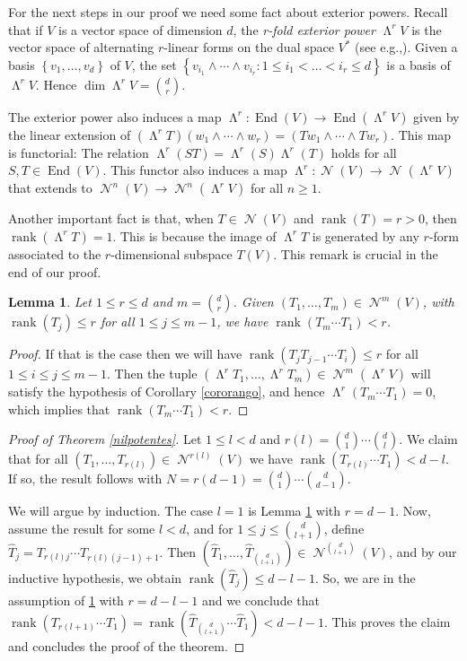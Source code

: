 \documentclass[11pt]{article}
\newcommand{\eg}{e.g.,\xspace}
\let\mathcal\mathscr
\theoremstyle{plain}
\newtheorem{lema}[teo]{Lemma}
\theoremstyle{definition}
\newcommand{\corchete}[1]{\left\{{#1}\right\}}
\DeclareMathOperator{\End}{End}
\DeclareMathOperator{\Nil}{\mathcal{N}}
\DeclareMathOperator{\rank}{rank}
\DeclareMathOperator{\Wedge}{\mathsf{\Lambda}}
\begin{document}
For the next steps in our proof we need some fact about exterior powers. Recall that if $V$ is a vector space of dimension $d$, the \textit{r-fold exterior power} $\Wedge^{r}{V}$ is the vector space of alternating $r$-linear forms on the dual space $V^*$ (see \eg \cite[XIX.1]{langalg}). Given a basis $\corchete{v_1,\dots, v_d}$ of $V$, the set
$\corchete{v_{i_1}\wedge \cdots \wedge v_{i_r} : 1\leq i_1<\dots <i_r\leq d}$ is a basis of $\Wedge^{r}{V}$. Hence $\dim {\Wedge^{r}V}=\binom{d}{r}$.

The exterior power also induces a map $\Wedge^{r}: \End(V) \rightarrow \End(\Wedge^{r}{V})$ given by the linear extension of $(\Wedge^{r}T)(w_1\wedge \cdots \wedge w_r)=(Tw_1\wedge \cdots \wedge Tw_r)$. This map is functorial: The relation $\Wedge^{r}(ST)=\Wedge^{r}(S)\Wedge^{r}(T)$ holds for all $S,T \in \End(V)$. This functor also induces a map $\Wedge^{r}: \Nil(V)\rightarrow \Nil(\Wedge^{r}{V})$ that extends to $\Nil^{n}(V)\rightarrow \Nil^{n}(\Wedge^{r}{V})$ for all $n\geq 1$.

Another important fact is that, when $T\in \Nil(V)$ and $\rank(T)=r>0$, then $\rank(\Wedge^{r}{T})=1$. This is because the image of $\Wedge^{r}{T}$ is generated by any $r$-form associated to the $r$-dimensional subspace $T(V)$. This remark is crucial in the end of our proof.

\begin{lema}\label{lemaa}
Let $1\leq r\leq d$ and $m=\binom{d}{r}$. Given $(T_1,\dots,T_m)\in \Nil^{m}(V)$, with $\rank(T_j) \leq r$ for all $1\leq j\leq m-1$, we have $\rank(T_{m}\cdots T_{1})<r$.
\end{lema}
\begin{proof}
If that is the case then we will have $\rank(T_{j}T_{j-1}\cdots T_{i})\leq r$ for all $1\leq i\leq j\leq m-1$. Then the tuple $(\Wedge^{r}{T_1},\dots,\Wedge^{r}{T_m})\in \Nil^{m}(\Wedge^{r}{V})$ will satisfy the hypothesis of Corollary \ref{cororango}, and hence $\Wedge^{r}(T_m\cdots T_1)=0$, which implies that \hbox{$\rank(T_m\cdots T_1 )<r$}.
\end{proof}

\begin{proof}[Proof of Theorem \ref{nilpotentes}]
Let $1\leq l< d$ and $r(l)= \binom{d}{1}\cdots \binom{d}{l}$. We claim that for all $(T_1,\dots,T_{r(l)})\in \Nil^{r(l)}(V)$ we have $\rank(T_{r(l)} \cdots T_{1})<d-l$. If so, the result follows with $N=r(d-1)=\binom{d}{1}\cdots \binom{d}{d-1}$.

We will argue by induction. The case $l=1$ is Lemma \ref{lemaa} with $r=d-1$. Now, assume the result for some $l<d$, and for $1\leq j \leq \binom{d}{l+1}$, define $\hat{T}_j=T_{r(l)j}\cdots T_{r(l)(j-1)+1}$. Then $(\hat{T}_1,\dots,\hat{T}_{\binom{d}{l+1}})\in \Nil^{\binom{d}{l+1}}(V)$, and by our inductive hypothesis, we obtain $\rank(\hat{T}_j)\leq d-l-1$. So, we are in the assumption of \ref{lemaa} with $r=d-l-1$ and we conclude that $\rank(T_{r(l+1)}\cdots T_{1})=\rank(\hat{T}_{\binom{d}{l+1}}\cdots \hat{T}_{1})<d-l-1$. This proves the claim and concludes the proof of the theorem.
\end{proof}
\end{document}
